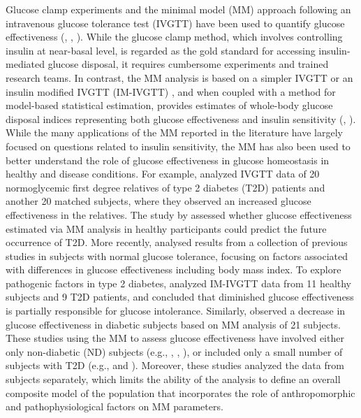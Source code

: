 \documentclass[utf8]{frontiersSCNS} %
\begin{document}
Glucose clamp experiments and the minimal model (MM) approach following an intravenous glucose tolerance test (IVGTT) have been used to quantify glucose effectiveness (\citet{Best1996}, \citet{Ader1997}, \citet{Dube2015}). While the glucose clamp method, which involves controlling insulin at near-basal level, is regarded as the gold standard for accessing insulin-mediated glucose disposal, it requires cumbersome experiments and trained research teams. In contrast, the MM analysis is based on a simpler IVGTT or an insulin modified IVGTT (IM-IVGTT) \citep{IM_IV_1998}, and when coupled with a method for model-based statistical estimation, provides estimates of whole-body glucose disposal indices representing both glucose effectiveness and insulin sensitivity (\citet{bergman_equ}, \citet{jan_equ}). While the many applications of the MM reported in the literature have largely focused on questions related to insulin sensitivity, the MM has also been used to better understand the role of glucose effectiveness in glucose homeostasis in healthy and disease conditions. For example, \citet{jan_relative} analyzed IVGTT data of 20 normoglycemic first degree relatives of type 2 diabetes (T2D) patients and another 20 matched subjects, where they observed an increased glucose effectiveness in the relatives. The study by \cite{lorenzo_2010} assessed whether glucose effectiveness estimated via MM analysis in healthy participants could predict the future occurrence of T2D. More recently, \citet{Morettini_2019} analysed results from a collection of previous studies in subjects with normal glucose tolerance, focusing on factors associated with differences in glucose effectiveness including body mass index. To explore pathogenic factors in type 2 diabetes, \citet{ataru_1992} analyzed IM-IVGTT data from 11 healthy subjects and 9 T2D patients, and concluded that diminished glucose effectiveness is partially responsible for glucose intolerance. Similarly, \citet{welch_1990} observed a decrease in glucose effectiveness in diabetic subjects based on MM analysis of 21 subjects. These studies using the MM to assess glucose effectiveness have involved either only non-diabetic (ND) subjects (e.g., \citet{jan_relative}, \cite{lorenzo_2010}, \citet{Morettini_2019}), or included only a small number of subjects with T2D (e.g., \citet{ataru_1992} and \citet{welch_1990}). Moreover, these studies analyzed the data from subjects separately, which limits the ability of the analysis to define an overall composite model of the population that incorporates the role of anthropomorphic and pathophysiological factors on MM parameters.
\end{document}
